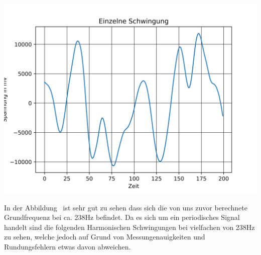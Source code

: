 \includegraphics[scale=0.5]{media/singleperiod.png}
\label{fig: Einzelne Schwingung}

In der Abbildung \ ist sehr gut zu sehen dass sich die von uns zuvor berechnete Grundfrequenz
bei ca. 238Hz befindet. Da es sich um ein periodisches Signal handelt sind die folgenden Harmonischen Schwingungen bei vielfachen von 238Hz zu sehen, welche jedoch auf Grund von Messungenauigkeiten und Rundungsfehlern etwas davon abweichen.